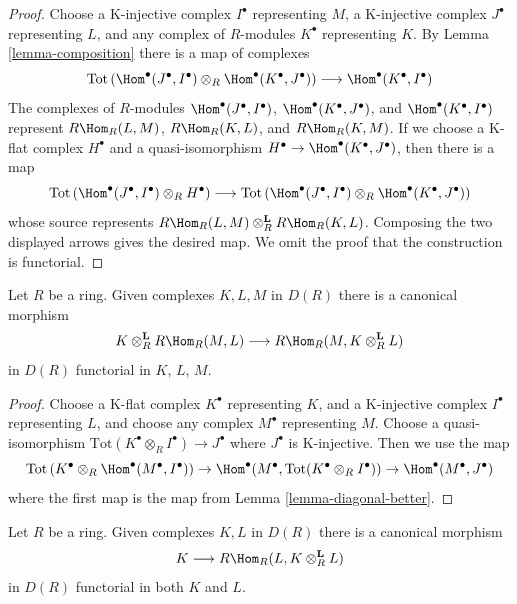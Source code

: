 \begin{proof}
Choose a K-injective complex $I^\bullet$ representing $M$,
a K-injective complex $J^\bullet$ representing $L$, and
any complex of $R$-modules $K^\bullet$ representing $K$.
By Lemma \ref{lemma-composition} there is a map of complexes
$$
\text{Tot}\left(
\Hom^\bullet(J^\bullet, I^\bullet) \otimes_R \Hom^\bullet(K^\bullet, J^\bullet)
\right)
\longrightarrow
\Hom^\bullet(K^\bullet, I^\bullet)
$$
The complexes of $R$-modules $\Hom^\bullet(J^\bullet, I^\bullet)$,
$\Hom^\bullet(K^\bullet, J^\bullet)$, and $\Hom^\bullet(K^\bullet, I^\bullet)$
represent $R\Hom_R(L, M)$, $R\Hom_R(K, L)$, and $R\Hom_R(K, M)$.
If we choose a K-flat complex $H^\bullet$ and a quasi-isomorphism
$H^\bullet \to \Hom^\bullet(K^\bullet, J^\bullet)$, then there is a map
$$
\text{Tot}\left(
\Hom^\bullet(J^\bullet, I^\bullet) \otimes_R H^\bullet
\right)
\longrightarrow
\text{Tot}\left(
\Hom^\bullet(J^\bullet, I^\bullet) \otimes_R \Hom^\bullet(K^\bullet, J^\bullet)
\right)
$$
whose source represents $R\Hom_R(L, M) \otimes_R^\mathbf{L} R\Hom_R(K, L)$.
Composing the two displayed arrows gives the desired map. We omit the
proof that the construction is functorial.
\end{proof}

\begin{lemma}
\label{lemma-internal-hom-diagonal-better}
Let $R$ be a ring. Given complexes $K, L, M$ in $D(R)$
there is a canonical morphism
$$
K \otimes_R^\mathbf{L} R\Hom_R(M, L)
\longrightarrow
R\Hom_R(M, K \otimes_R^\mathbf{L} L)
$$
in $D(R)$ functorial in $K$, $L$, $M$.
\end{lemma}

\begin{proof}
Choose a K-flat complex $K^\bullet$ representing $K$,
and a K-injective complex $I^\bullet$ representing $L$, and
choose any complex $M^\bullet$ representing $M$.
Choose a quasi-isomorphism
$\text{Tot}(K^\bullet \otimes_R I^\bullet) \to J^\bullet$
where $J^\bullet$ is K-injective. Then we use the map
$$
\text{Tot}\left(
K^\bullet \otimes_R \Hom^\bullet(M^\bullet, I^\bullet)
\right)
\to
\Hom^\bullet(M^\bullet, \text{Tot}(K^\bullet \otimes_R I^\bullet))
\to
\Hom^\bullet(M^\bullet, J^\bullet)
$$
where the first map is the map from Lemma \ref{lemma-diagonal-better}.
\end{proof}

\begin{lemma}
\label{lemma-internal-hom-diagonal}
Let $R$ be a ring. Given complexes $K, L$ in $D(R)$
there is a canonical morphism
$$
K \longrightarrow R\Hom_R(L, K \otimes_R^\mathbf{L} L)
$$
in $D(R)$ functorial in both $K$ and $L$.
\end{lemma}

